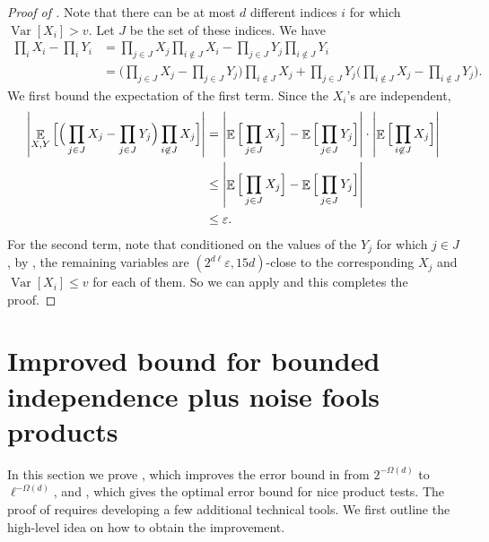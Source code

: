 \documentclass{toc}
\def\eps{\varepsilon}
\def\Blocklength{\ell}
\DeclarePairedDelimiter{\abs}{\lvert}{\rvert}
\DeclareMathOperator*{\E}{\mathbb{E}}                 %
\DeclareMathOperator*{\Var}{Var}                 %
\begin{document}
  \begin{proof}[Proof of {}]
    Note that there can be at most $d$ different indices $i$ for which $\Var[X_i] > v$.
  	Let $J$ be the set of these indices.
  	We have
  	\begin{align*}
  	  \prod_i X_i - \prod_i Y_i
  	  &= \prod_{j \in J} X_j \prod_{i \not\in J} X_i - \prod_{j \in J} Y_j \prod_{i \not\in J} Y_i \\
  	  &= \Big( \prod_{j \in J} X_j - \prod_{j \in J} Y_j \Big)  \prod_{i \not\in J} X_j + \prod_{j \in J} Y_j \Big( \prod_{i \not\in J} X_j - \prod_{i \not\in J} Y_j \Big) .
  	\end{align*}
  	We first bound the expectation of the first term.
  	Since the $X_i$'s are independent,
  	\begin{align*}
  	  \abs*{ \E_{X, Y} \Big[ \Big( \prod_{j \in J} X_j - \prod_{j \in J} Y_j \Big)  \prod_{i \not\in J} X_j \Big] }
  	  &= \abs*{ \E \Big[ \prod_{j \in J} X_j \Big] - \E \Big[ \prod_{j \in J} Y_j \Big] } \cdot \abs*{ \E \Big[ \prod_{i \not\in J} X_j \Big] } \\
  	  &\le \abs*{ \E \Big[ \prod_{j \in J} X_j \Big] - \E \Big[ \prod_{j \in J} Y_j \Big] } \\
  	  &\le \eps .
  	\end{align*}
    For the second term, note that conditioned on the values of the $Y_j$ for which $j \in J$, by , the remaining variables are $(2^{d \Blocklength} \eps, 15d)$-close to the corresponding $X_j$ and $\Var[X_i] \le v$ for each of them.
    So we can apply  and this completes the proof.
	\end{proof}

  \section{Improved bound for bounded independence plus noise fools products} \label{sec:stronger}
  In this section we prove , which improves the error bound in  from $2^{-\Omega(d)}$ to $\Blocklength^{-\Omega(d)}$, and , which gives the optimal error bound for nice product tests.
  The proof of   requires developing a few additional technical tools.
  We first outline the high-level idea on how to obtain the improvement.
\end{document}
